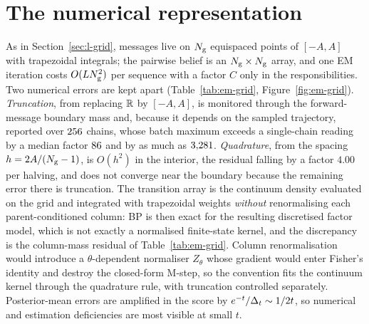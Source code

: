 \section{The numerical representation}
\label{sec:em-numerical}

As in Section~\ref{sec:l-grid}, messages live on $N_{\mathrm{g}}$ equispaced points of
$[-A,A]$ with trapezoidal integrals; the pairwise belief is an
$N_{\mathrm{g}}\times N_{\mathrm{g}}$ array, and one EM iteration costs $O(LN_{\mathrm{g}}^2)$ per
sequence with a factor $C$ only in the responsibilities. Two numerical errors
are kept apart (Table~\ref{tab:em-grid}, Figure~\ref{fig:em-grid}).
\emph{Truncation}, from replacing $\mathbb{R}$ by $[-A,A]$, is monitored through the
forward-message boundary mass and, because it depends on the sampled
trajectory, reported over $256$ chains, whose batch maximum exceeds a
single-chain reading by a median factor $86$ and by as much as
$3{,}281$. \emph{Quadrature}, from the spacing $h = 2A/(N_{\mathrm{g}}-1)$, is
$O(h^2)$ in the interior, the residual falling by a factor $4.00$ per halving,
and does not converge near the boundary because the remaining error there is
truncation. The transition array is the continuum density evaluated on the
grid and integrated with trapezoidal weights \emph{without} renormalising each
parent-conditioned column: BP is then exact for the resulting discretised
factor model, which is not exactly a normalised finite-state kernel, and the
discrepancy is the column-mass residual of Table~\ref{tab:em-grid}. Column
renormalisation would introduce a $\theta$-dependent normaliser $Z_\theta$
whose gradient would enter Fisher's identity and destroy the closed-form
M-step, so the convention fits the continuum kernel through the quadrature
rule, with truncation controlled separately. Posterior-mean errors are
amplified in the score by $e^{-t}/\Delta_t \sim 1/2t$, so numerical and
estimation deficiencies are most visible at small $t$.

